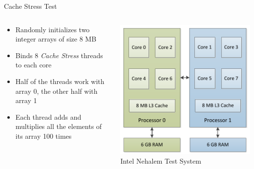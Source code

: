 \begin{frame}{Cache Stress Test}
  \begin{columns}[c]
    \begin{column}{0.47\textwidth}
      \begin{itemize}
      \item Randomly initializes two integer arrays of size 8 MB
      \item Binds 8 \emph{Cache Stress} threads to each core
      \item Half of the threads work with array 0, the other half with
        array 1
      \item Each thread adds and multiplies all the elements of its
        array 100 times
      \end{itemize}
    \end{column}
    \begin{column}{0.53\textwidth}
      \begin{center}
        \includegraphics[width=\textwidth]{figures/mafushi} \\
        \tiny{Intel Nehalem Test System}
      \end{center}
    \end{column}
  \end{columns}
\end{frame}

